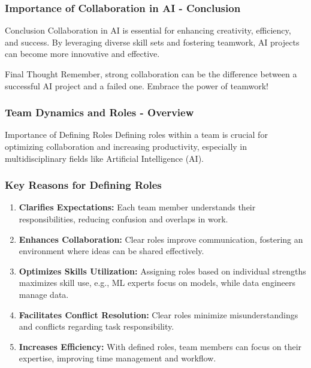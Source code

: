 \documentclass[aspectratio=169]{beamer}
\begin{document}
\begin{frame}[fragile]
    \frametitle{Importance of Collaboration in AI - Conclusion}
    \begin{block}{Conclusion}
        Collaboration in AI is essential for enhancing creativity, efficiency, and success. By leveraging diverse skill sets and fostering teamwork, AI projects can become more innovative and effective.
    \end{block}
    \begin{alertblock}{Final Thought}
        Remember, strong collaboration can be the difference between a successful AI project and a failed one. Embrace the power of teamwork!
    \end{alertblock}
\end{frame}

\begin{frame}[fragile]
  \frametitle{Team Dynamics and Roles - Overview}
  \begin{block}{Importance of Defining Roles}
    Defining roles within a team is crucial for optimizing collaboration and increasing productivity, especially in multidisciplinary fields like Artificial Intelligence (AI).
  \end{block}
\end{frame}

\begin{frame}[fragile]
  \frametitle{Key Reasons for Defining Roles}
  \begin{enumerate}
    \item \textbf{Clarifies Expectations:}
      Each team member understands their responsibilities, reducing confusion and overlaps in work.
      
    \item \textbf{Enhances Collaboration:}
      Clear roles improve communication, fostering an environment where ideas can be shared effectively.
      
    \item \textbf{Optimizes Skills Utilization:}
      Assigning roles based on individual strengths maximizes skill use, e.g., ML experts focus on models, while data engineers manage data.
      
    \item \textbf{Facilitates Conflict Resolution:}
      Clear roles minimize misunderstandings and conflicts regarding task responsibility.
      
    \item \textbf{Increases Efficiency:}
      With defined roles, team members can focus on their expertise, improving time management and workflow.
  \end{enumerate}
\end{frame}
\end{document}

